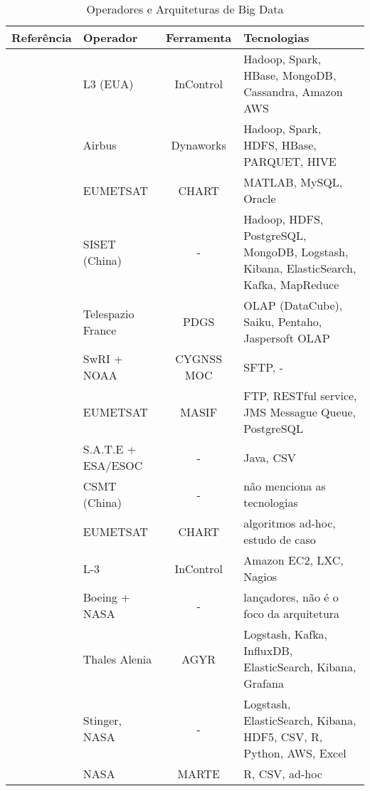 \begin{table}[!ht]%
  \begin{center}
  \caption{Operadores e Arquiteturas de Big Data}
  \begin{tabular}{|C{8em}|C{6em}|c|C{10em}|}
      \hline
	  \bfseries Referência &\bfseries Operador &\bfseries Ferramenta &\bfseries Tecnologias \\
	  \hline
	  \cite{adamskiDataAnalyticsLarge2016} & L3 (EUA) & InControl & Hadoop, Spark, HBase, MongoDB, Cassandra, Amazon AWS \\
	  \hline
	  \cite{boussoufBigDataBased2018} & Airbus & Dynaworks & Hadoop, Spark, HDFS, HBase, PARQUET, HIVE \\
	  \hline
	  \cite{schulsterCHARTingFutureOffline2018} & EUMETSAT & CHART & MATLAB, MySQL, Oracle \\
	  \hline
	  \cite{zhangBigDataFramework2017} & SISET (China) & - & Hadoop, HDFS, PostgreSQL, MongoDB, Logstash, Kibana, ElasticSearch, Kafka, MapReduce \\
	  \hline
	  \cite{yvernesCopernicusGroundSegment2018} & Telespazio France & PDGS & OLAP (DataCube), Saiku, Pentaho, Jaspersoft OLAP \\
	  \hline
	  \cite{dischnerCYGNSSMOCMeeting2016} & SwRI + NOAA & CYGNSS MOC & SFTP, - \\
	  \hline
	  \cite{edwardsDealingBigData2018} & EUMETSAT & MASIF & FTP, RESTful service, JMS Messague Queue, PostgreSQL \\
	  \hline
	  \cite{evansDataMiningDrastically2016} & S.A.T.E + ESA/ESOC & - & Java, CSV \\
	  \hline
	  \cite{fenManagementOperationCommunication2016} & CSMT (China) & - & não menciona as tecnologias \\
	  \hline
	  \cite{trollopeAnalysisAutomatedTechniques2018} & EUMETSAT & CHART & algoritmos ad-hoc, estudo de caso \\
	  \hline
	  \cite{gillesFlyingLargeConstellations2016} & L-3 & InControl & Amazon EC2, LXC, Nagios \\
	  \hline
	  \cite{highsmithSpaceLaunchSystem2015} & Boeing + NASA & - & lançadores, não é o foco da arquitetura \\
	  \hline
	  \cite{hennionBigdataSatelliteYearly2018} & Thales Alenia & AGYR & Logstash, Kafka, InfluxDB, ElasticSearch, Kibana, Grafana \\
	  \hline
	  \cite{mateikUsingBigData2017} & Stinger, NASA & - & Logstash, ElasticSearch, Kibana, HDF5, CSV, R, Python, AWS, Excel \\
	  \hline
	  \cite{fernandezTelemetryAnomalyDetection2017} & NASA & MARTE & R, CSV, ad-hoc \\
	  \hline
    \end{tabular}
    \end{center}
  \label{table:bigdataoperators}
\end{table}


